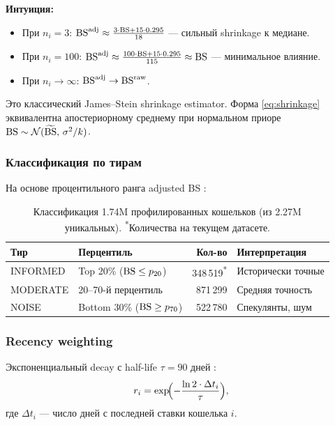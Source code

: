 \textbf{Интуиция:}
\begin{itemize}[nosep]
  \item При $n_i = 3$: $\mathrm{BS}^{\mathrm{adj}} \approx \frac{3 \cdot \mathrm{BS} + 15 \cdot 0.295}{18}$ ---
    сильный shrinkage к медиане.
  \item При $n_i = 100$: $\mathrm{BS}^{\mathrm{adj}} \approx \frac{100 \cdot \mathrm{BS} + 15 \cdot 0.295}{115} \approx \mathrm{BS}$ ---
    минимальное влияние.
  \item При $n_i \to \infty$: $\mathrm{BS}^{\mathrm{adj}} \to \mathrm{BS}^{\mathrm{raw}}$.
\end{itemize}

Это классический James--Stein shrinkage estimator.
Форма \eqref{eq:shrinkage} эквивалентна апостериорному среднему
при нормальном приоре $\mathrm{BS} \sim \mathcal{N}(\widetilde{\mathrm{BS}},\, \sigma^2/k)$.

\subsubsection{Классификация по тирам}

На основе процентильного ранга adjusted BS
\citep{akey2025polymarket,mitts2026informed}:

\begin{table}[h]
\centering
\begin{tabular}{llrl}
\toprule
\textbf{Тир} & \textbf{Перцентиль} & \textbf{Кол-во} & \textbf{Интерпретация} \\
\midrule
INFORMED  & Top 20\% ($\mathrm{BS} \leq p_{20}$)        & 348\,519\textsuperscript{*} & Исторически точные \\
MODERATE  & 20--70-й перцентиль                   & 871\,299 & Средняя точность \\
NOISE     & Bottom 30\% ($\mathrm{BS} \geq p_{70}$)       & 522\,780 & Спекулянты, шум \\
\bottomrule
\end{tabular}
\caption{Классификация 1.74M профилированных кошельков (из 2.27M уникальных).
\textsuperscript{*}Количества на текущем датасете.}
\label{tab:tiers}
\end{table}

\subsubsection{Recency weighting}

Экспоненциальный decay с half-life $\tau = 90$ дней
\citep{burgi2025kalshi}:
\begin{equation}
\label{eq:recency}
r_i = \exp\!\Bigl(-\frac{\ln 2 \cdot \Delta t_i}{\tau}\Bigr),
\end{equation}
где $\Delta t_i$ --- число дней с последней ставки кошелька $i$.

